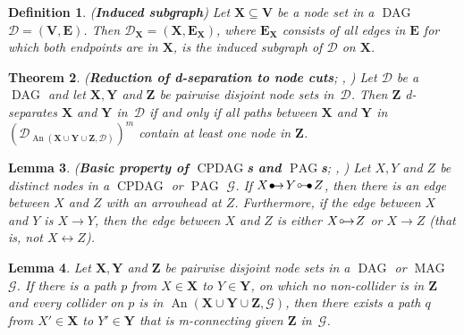 \documentclass[11pt,a4paper]{article}
\newtheorem{definition}{Definition}
\newtheorem{theorem}[definition]{Theorem}
\newtheorem{lemma}[definition]{Lemma}
\DeclareMathOperator{\CPDAG}{CPDAG}
\DeclareMathOperator{\DAG}{DAG}
\DeclareMathOperator{\MAG}{MAG}
\DeclareMathOperator{\PAG}{PAG}
\DeclareMathOperator{\An}{An}
\newcommand{\g}[1][G]{\mathcal{#1}}
\newcommand{\circbullet}{
  \setlength{\unitlength}{1mm}
  \begin{picture}(5,1)(0,0)
    \put(1,1){\circle{1}}
    \put(1.5,1){\line(1,0){2.4}}
    \put(2.9,0){$\bullet$}
  \end{picture}
}
\newcommand{\bulletarrow}{
  \setlength{\unitlength}{1mm}
  \begin{picture}(5,1)(0,0)
    \put(0.2,0){$\bullet$}
    \put(1,0){$\rightarrow$}
  \end{picture}
}
\newcommand{\circarrow}{
  \setlength{\unitlength}{1mm}
  \begin{picture}(5,1)(0,0)
    \put(1,1){\circle{1}}
    \put(1.2,0){$\rightarrow$}
  \end{picture}
}
\begin{document}
\begin{definition}{(\textbf{Induced subgraph})} 
Let $\mathbf{X} \subseteq \mathbf{V}$ be a node set in a $\DAG$ $\g[D] = (\mathbf{V},\mathbf{E})$. Then $\g[D]_\mathbf{X} = (\mathbf{X},\mathbf{E}_\mathbf{X})$, where $\mathbf{E}_\mathbf{X}$ consists of all edges in $\mathbf{E}$ for which both endpoints are in $\mathbf{X}$, is the induced subgraph of $\g[D]$ on $\mathbf{X}$.
\label{def:induced-subgraph}
\end{definition}

\begin{theorem} (\textbf{Reduction of d-separation to node cuts}; \citealp[cf.\ Proposition 3 in][]{lauritzen1990independence}, \citealp[cf.\ Corollary 2 in][]{richardson2003markov}) 
Let $\g[D]$ be a $\DAG$ and let $\mathbf{X},\mathbf{Y}$ and $\mathbf{Z}$ be pairwise disjoint node sets in~$\g[D]$. Then $\mathbf{Z}$ d-separates $\mathbf{X}$ and $\mathbf{Y}$ in~$\g[D]$ if and only if all paths between $\mathbf{X}$ and $\mathbf{Y}$ in $(\g[D]_{\An(\mathbf{X} \cup \mathbf{Y} \cup \mathbf{Z},\g[D])})^m$ contain at least one node in $\mathbf{Z}$.
\label{theorem:moralization}
\end{theorem}


\begin{lemma}
   {(\textbf{Basic property of $\CPDAG$s and $\PAG$s}; \citealp[cf.\ Lemma~1 in][]{meek1995causal}, \citealp[cf.\ Lemma~3.3.1 in][]{zhang2006causal})}
   Let $X,Y$ and $Z$ be distinct nodes in a $\CPDAG$ or $\PAG$ $\g$. If $X \bulletarrow Y \circbullet Z$, then there is an edge between $X$ and $Z$ with an arrowhead at $Z$. Furthermore, if the edge between $X$ and $Y$ is $X \rightarrow Y$, then the edge between $X$ and $Z$ is either $X \circarrow Z$ or $X \rightarrow Z$ (that is, not $X \leftrightarrow Z$).
   \label{lemma:basic property of cpdags and pags}
\end{lemma}

\begin{lemma}{\citep[cf.\ Lemma~1 in][]{richardson2003markov}} Let $\mathbf{X,Y}$ and $\mathbf{Z}$ be pairwise disjoint node sets in a $\DAG$ or $\MAG$ $\g$. If there is a path $p$ from $X \in \mathbf{X}$ to $Y \in \mathbf{Y}$, on which no non-collider is in $\mathbf{Z}$ and every collider on $p$ is in $\An(\mathbf{X} \cup \mathbf{Y} \cup \mathbf{Z}, \g)$, then there exists a path $q$ from $X' \in \mathbf{X}$ to $Y' \in \mathbf{Y}$ that is m-connecting given $\mathbf{Z}$ in~$\g$.
\label{lemma:rich}
\end{lemma}
\end{document}

